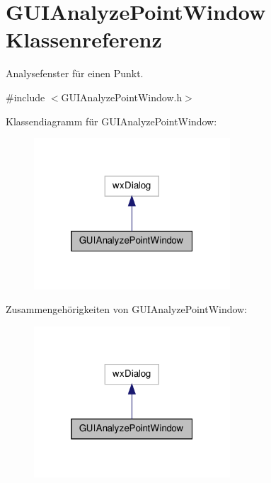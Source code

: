 \hypertarget{classGUIAnalyzePointWindow}{\section{G\-U\-I\-Analyze\-Point\-Window Klassenreferenz}
\label{classGUIAnalyzePointWindow}
}


Analysefenster für einen Punkt.  




{\ttfamily \#include $<$G\-U\-I\-Analyze\-Point\-Window.\-h$>$}



Klassendiagramm für G\-U\-I\-Analyze\-Point\-Window\-:\nopagebreak
\begin{figure}[H]
\begin{center}
\leavevmode
\includegraphics[width=208pt]{classGUIAnalyzePointWindow__inherit__graph}
\end{center}
\end{figure}


Zusammengehörigkeiten von G\-U\-I\-Analyze\-Point\-Window\-:\nopagebreak
\begin{figure}[H]
\begin{center}
\leavevmode
\includegraphics[width=208pt]{classGUIAnalyzePointWindow__coll__graph}
\end{center}
\end{figure}
